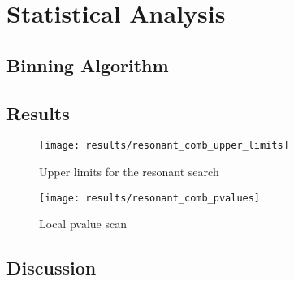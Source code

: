 \section{Statistical Analysis}


\subsection{Binning Algorithm}
\label{sec:binning_alg}


\subsection{Results}

\begin{figure}[htbp]
  \centering

  \texttt{[image: results/resonant\_comb\_upper\_limits]}

  \caption{Upper limits for the resonant search}
  \label{fig:res_upper_limits}
\end{figure}

\begin{figure}[htbp]
  \centering

  \texttt{[image: results/resonant\_comb\_pvalues]}

  \caption{Local pvalue scan}
  \label{fig:local_pvalues}
\end{figure}

\subsection{Discussion}


